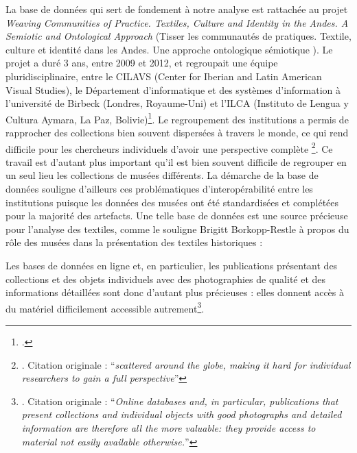 La base de données qui sert de fondement à notre analyse est rattachée au projet \textit{Weaving Communities of Practice. Textiles, Culture and Identity in the Andes. A Semiotic and Ontological Approach} (\og Tisser les communautés de pratiques. Textile, culture et identité dans les Andes. Une approche ontologique sémiotique \fg). Le projet a duré 3 ans, entre 2009 et 2012, et regroupait une équipe pluridisciplinaire, entre le CILAVS (Center for Iberian and Latin American Visual Studies), le Département d'informatique et des systèmes d'information à l'université de Birbeck (Londres, Royaume-Uni) et l'ILCA (Instituto de Lengua y Cultura Aymara, La Paz, Bolivie)\footcite{martinsExploringWeavingStructures2013}. Le regroupement des institutions a permis de rapprocher des collections bien souvent \og dispersées à travers le monde, ce qui rend difficile pour les chercheurs individuels d'avoir une perspective complète \fg\footnote{\cite[p.~3]{brownlowOntologicalApproachCreating2015}. Citation originale : \textquotedblleft \textit{scattered around the globe, making it hard for individual researchers to gain a full perspective}\textquotedblright}. Ce travail est d'autant plus important qu'il est bien souvent difficile de regrouper en un seul lieu les collections de musées différents. La démarche de la base de données souligne d'ailleurs ces problématiques d'interopérabilité entre les institutions puisque les données des musées ont été standardisées et complétées pour la majorité des artefacts. Une telle base de données est une source précieuse pour l'analyse des textiles, comme le souligne Brigitt Borkopp-Restle à propos du rôle des musées dans la présentation des textiles historiques : 
\begin{citer}
Les bases de données en ligne et, en particulier, les publications présentant des collections et des objets individuels avec des photographies de qualité et des informations détaillées sont donc d'autant plus précieuses : elles donnent accès à du matériel difficilement accessible autrement\footnote{\cite[p.~47]{borkopp-restleMuseumsMakingTextile2016}. Citation originale : \textquotedblleft \textit{Online databases and, in particular, publications that present collections and individual objects with good photographs and detailed information are therefore all the more valuable: they provide access to material not easily available otherwise.}\textquotedblright}.
\end{citer}

